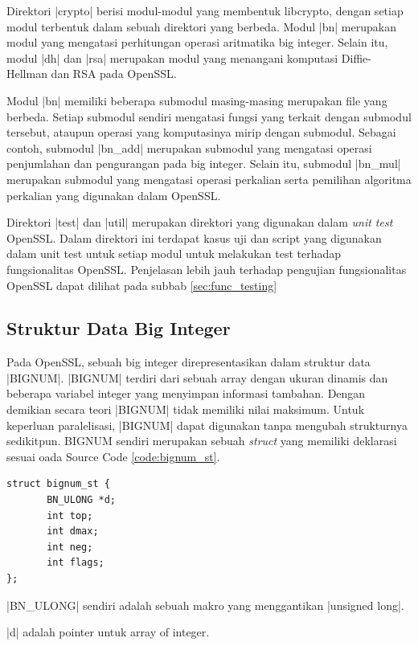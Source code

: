     Direktori |crypto| berisi modul-modul yang membentuk libcrypto, dengan setiap modul terbentuk dalam sebuah direktori yang berbeda. Modul |bn| merupakan modul yang mengatasi perhitungan operasi aritmatika big integer. Selain itu, modul |dh| dan |rsa| merupakan modul yang menangani komputasi Diffie-Hellman dan RSA pada OpenSSL.

    Modul |bn| memiliki beberapa submodul masing-masing merupakan file yang berbeda. Setiap submodul sendiri mengatasi fungsi yang terkait dengan submodul tersebut, ataupun operasi yang komputasinya mirip dengan submodul. Sebagai contoh, submodul |bn_add| merupakan submodul yang mengatasi operasi penjumlahan dan pengurangan pada big integer. Selain itu, submodul |bn_mul| merupakan submodul yang mengatasi operasi perkalian serta pemilihan algoritma perkalian yang digunakan dalam OpenSSL.

    Direktori |test| dan |util| merupakan direktori yang digunakan dalam \textit{unit test} OpenSSL. Dalam direktori ini terdapat kasus uji dan script yang digunakan dalam unit test untuk setiap modul untuk melakukan test terhadap fungsionalitas OpenSSL. Penjelasan lebih jauh terhadap pengujian fungsionalitas OpenSSL dapat dilihat pada subbab \ref{sec:func_testing}

  \subsection{Struktur Data Big Integer} \label{sec:bignum_struct}
    Pada OpenSSL, sebuah big integer direpresentasikan dalam struktur data |BIGNUM|. |BIGNUM| terdiri dari sebuah array dengan ukuran dinamis dan beberapa variabel integer yang menyimpan informasi tambahan. Dengan demikian secara teori |BIGNUM| tidak memiliki nilai maksimum. Untuk keperluan paralelisasi, |BIGNUM| dapat digunakan tanpa mengubah strukturnya sedikitpun. BIGNUM sendiri merupakan sebuah \textit{struct} yang memiliki deklarasi sesuai oada Source Code \ref{code:bignum_st}.

    \begin{lstlisting}[caption={Struktur Data bignum}, label={code:bignum_st}]
struct bignum_st {
       BN_ULONG *d;
       int top;
       int dmax;
       int neg;
       int flags;
};
    \end{lstlisting}

    |BN_ULONG| sendiri adalah sebuah makro yang menggantikan |unsigned long|.

    |d| adalah pointer untuk array of integer.

